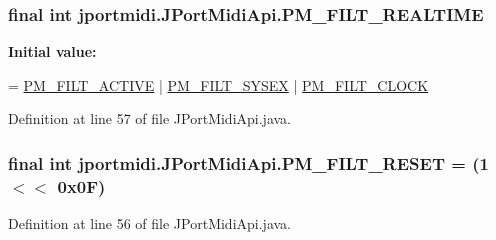 \subsubsection[{\texorpdfstring{P\+M\+\_\+\+F\+I\+L\+T\+\_\+\+R\+E\+A\+L\+T\+I\+ME}{PM_FILT_REALTIME}}]{\setlength{\rightskip}{0pt plus 5cm}final {\bf int} jportmidi.\+J\+Port\+Midi\+Api.\+P\+M\+\_\+\+F\+I\+L\+T\+\_\+\+R\+E\+A\+L\+T\+I\+ME\hspace{0.3cm}{\ttfamily [static]}}\hypertarget{classjportmidi_1_1_j_port_midi_api_af5443c23efcc8005cbed5c5de69991ab}{}\label{classjportmidi_1_1_j_port_midi_api_af5443c23efcc8005cbed5c5de69991ab}
{\bfseries Initial value\+:}
\begin{DoxyCode}
=
            \hyperlink{classjportmidi_1_1_j_port_midi_api_a06288ff48f23e061825247d016e9ecac}{PM\_FILT\_ACTIVE} | \hyperlink{classjportmidi_1_1_j_port_midi_api_ae5e2de89685b28ce28dcb76d00319154}{PM\_FILT\_SYSEX} | 
      \hyperlink{classjportmidi_1_1_j_port_midi_api_ac6eb56f5baf43702f5f0d165e24fa78c}{PM\_FILT\_CLOCK}
\end{DoxyCode}


Definition at line 57 of file J\+Port\+Midi\+Api.\+java.

\subsubsection[{\texorpdfstring{P\+M\+\_\+\+F\+I\+L\+T\+\_\+\+R\+E\+S\+ET}{PM_FILT_RESET}}]{\setlength{\rightskip}{0pt plus 5cm}final {\bf int} jportmidi.\+J\+Port\+Midi\+Api.\+P\+M\+\_\+\+F\+I\+L\+T\+\_\+\+R\+E\+S\+ET = (1 $<$$<$ 0x0\+F)\hspace{0.3cm}{\ttfamily [static]}}\hypertarget{classjportmidi_1_1_j_port_midi_api_adf4947e98496b463c6f3c5773b28bc00}{}\label{classjportmidi_1_1_j_port_midi_api_adf4947e98496b463c6f3c5773b28bc00}


Definition at line 56 of file J\+Port\+Midi\+Api.\+java.

